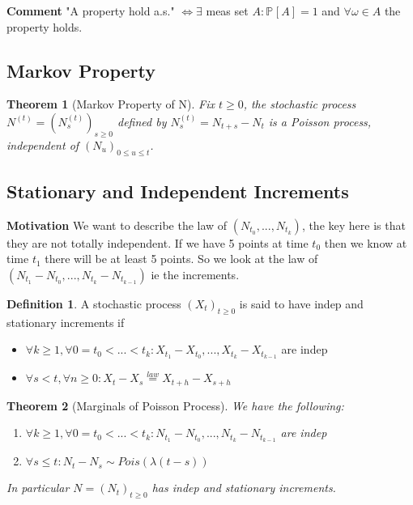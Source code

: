 \documentclass[12pt]{book}
\renewcommand{\iff}{\Leftrightarrow}
\newtheorem{theorem}{Theorem}[section]
\theoremstyle{definition}
\newtheorem{defn}{Definition}[section]
\theoremstyle{remark}
\begin{document}
\noindent
\textbf{Comment} "A property hold a.s." $\iff \exists$ meas set $A: \mathbb{P}_{} \left[ A \right] =1$ and $\forall \omega \in A$ the property holds. 


\subsection{Markov Property}
\begin{theorem}[Markov Property of N]
	Fix $t\geq 0$, the stochastic process $N^{(t)}=(N^{(t)}_{s})_{s \geq 0}$ defined by $N^{(t)}_s = N_{t+s}-N_{t}$ is a Poisson process, independent of $(N_u)_{0 \leq u \leq t}$.
\end{theorem}

\subsection{Stationary and Independent Increments}
\textbf{Motivation} We want to describe the law of $(N_{t_0},...,N_{t_k})$, the key here is that they are not totally independent. If we have 5 points at time $t_0$ then we know at time $t_1$ there will be at least 5 points. So we look at the law of $(N_{t_1}-N_{t_0},...,N_{t_k}-N_{t_{k-1}})$ ie the increments.

\begin{defn}
	A stochastic process $(X_t)_{t\geq 0}$ is said to have indep and stationary increments if 
\begin{itemize}
	\item $\forall k \geq 1, \forall 0=t_0 < ... < t_k: X_{t_1}-X_{t_0}, ..., X_{t_k}- X _{t_{k-1}}$ are indep
	\item $\forall  s<t, \forall  n \geq 0: X_t - X_s \stackrel{law}{=} X _{t+h}-X_{s+h}$
\end{itemize}

\end{defn}

\begin{theorem}[Marginals of Poisson Process]
We have the following:
\begin{enumerate}
	\item $\forall k \geq 1, \forall 0=t_0<...<t_k: N_{t_1}-N_{t_0},...,N_{t_k}- N_{t_{k-1}}$ are indep
	\item $\forall s \leq t: N_t - N_s \sim Pois(\lambda (t-s))$
\end{enumerate}
In particular $N=(N_t)_{t\geq 0}$ has indep and stationary increments.
	
\end{theorem}
\end{document}
